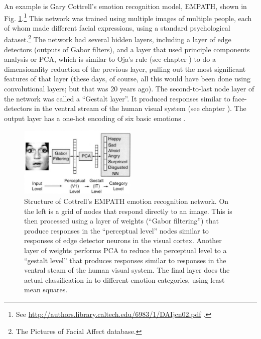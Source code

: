 An example is Gary Cottrell's  emotion recognition model, EMPATH, shown in Fig. \ref{face_net}.\footnote{See \url{http://authors.library.caltech.edu/6983/1/DAIjcn02.pdf} \cite{dailey2002empath}.} This network was trained using multiple images of multiple people, each of whom made different facial expressions, using a standard psychological dataset.\footnote{The Pictures of Facial Affect database.}  The network had several hidden layers, including a layer of edge detectors (outputs of Gabor filters), and a layer that used principle components analysis or PCA, which is similar to Oja's rule (see chapter ) to do a dimensionality reduction of the previous layer, pulling out the most significant features of that layer (these days, of course, all this would have been done using convolutional layers; but that was 20 years ago). The second-to-last node layer of the network was called a ``Gestalt layer''. It produced responses similar to face-detectors in the ventral stream of the human visual system  (see chapter ). The output layer has a one-hot encoding of six basic emotions \cite{dailey2002empath}. 

\begin{figure}[h]
\centering
\includegraphics[width=0.5\textwidth]{images/face_network.png}
\caption[From Adolphs, Cottrell, Dailey and Padgett, 2002  \cite{dailey2002empath}.]{Structure of Cottrell's EMPATH emotion recognition network. On the left is a grid of nodes that respond directly to an image. This is then processed using a layer of weights (``Gabor filtering'') that produce responses in the ``perceptual level'' nodes similar to responses of edge detector neurons in the visual cortex. Another layer of weights performs PCA to reduce the perceptual level to a ``gestalt level'' that produces responses similar to responses in the ventral steam of the human visual system. The final layer does the actual classification in to different emotion categories, using least mean squares. }
\label{face_net}
\end{figure}

